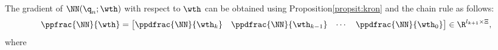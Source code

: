 \documentclass[letterpaper, journal]{IEEEtran}
\providecommand{\DIFadd}[1]{{\protect\color{blue}\uwave{#1}}} %
\providecommand{\DIFdel}[1]{{\protect\color{red}\sout{#1}}} %
\providecommand{\DIFaddbegin}{} %
\providecommand{\DIFaddend}{} %
\providecommand{\DIFdelbegin}{} %
\providecommand{\DIFdelend}{} %
\begin{document}
The gradient of \DIFdelbegin \DIFdel{$ \NN({\q}_n;\wth)$ }\DIFdelend \DIFaddbegin \DIFadd{$ \NN(\NNin;\wth)$ }\DIFaddend with respect to $\wth$ can be obtained using Proposition\DIFaddbegin \DIFadd{~}\DIFaddend \ref{propsit:kron} and the chain rule as follows:
\DIFdelbegin %
\DIFdelend \DIFaddbegin \begin{equation}
  \ppfrac{\NN}{\wth}=
  \begin{bmatrix}
    \ppdfrac{\NN}{\wth_k}&
    \ppdfrac{\NN}{\wth_{k-1}}&
\cdots &
    \ppdfrac{\NN}{\wth_0}
  \end{bmatrix}
  \in\R^{l_{k+1} \times \Xi}
  ,
  \label{eq:gradient:phi}
\end{equation}\DIFaddend 
where
\DIFdelbegin %
\end{document}
